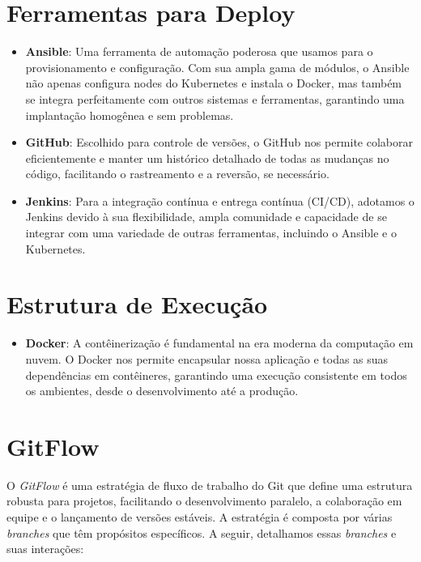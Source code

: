 \section{Ferramentas para Deploy}

\begin{itemize}
	\item \textbf{Ansible}: Uma ferramenta de automação poderosa que usamos para o provisionamento e configuração. Com sua ampla gama de módulos, o Ansible não apenas configura nodes do Kubernetes e instala o Docker, mas também se integra perfeitamente com outros sistemas e ferramentas, garantindo uma implantação homogênea e sem problemas.

	\item \textbf{GitHub}: Escolhido para controle de versões, o GitHub nos permite colaborar eficientemente e manter um histórico detalhado de todas as mudanças no código, facilitando o rastreamento e a reversão, se necessário.

	\item \textbf{Jenkins}: Para a integração contínua e entrega contínua (CI/CD), adotamos o Jenkins devido à sua flexibilidade, ampla comunidade e capacidade de se integrar com uma variedade de outras ferramentas, incluindo o Ansible e o Kubernetes.
\end{itemize}

\section{Estrutura de Execução}

\begin{itemize}
	\item \textbf{Docker}: A contêinerização é fundamental na era moderna da computação em nuvem. O Docker nos permite encapsular nossa aplicação e todas as suas dependências em contêineres, garantindo uma execução consistente em todos os ambientes, desde o desenvolvimento até a produção.
\end{itemize}
\section{GitFlow}
O \textit{GitFlow} é uma estratégia de fluxo de trabalho do Git que define uma estrutura robusta para projetos, facilitando o desenvolvimento paralelo, a colaboração em equipe e o lançamento de versões estáveis. A estratégia é composta por várias \textit{branches} que têm propósitos específicos. A seguir, detalhamos essas \textit{branches} e suas interações:

